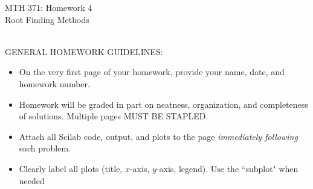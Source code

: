 \documentclass[addpoints, 11pt]{exam}
\begin{document}
\vspace{100mm}
\begin{center} \Large
MTH 371: Homework 4 \\ Root Finding Methods \normalsize
\end{center}
\ \\
\noindent GENERAL HOMEWORK GUIDELINES: 
\begin{itemize}
\item On the very first page of your homework, provide your name, date, and homework number.\vspace{-2mm}
\item Homework will be graded in part on neatness, organization, and completeness of solutions. Multiple pages MUST BE STAPLED. \vspace{-2mm}
\item Attach all Scilab code, output, and plots to the page \emph{immediately following} each problem. \vspace{-2mm}
\item Clearly label all plots (title, $x$-axis, $y$-axis, legend). Use the ``subplot" when needed
\end{itemize}
\end{document}
